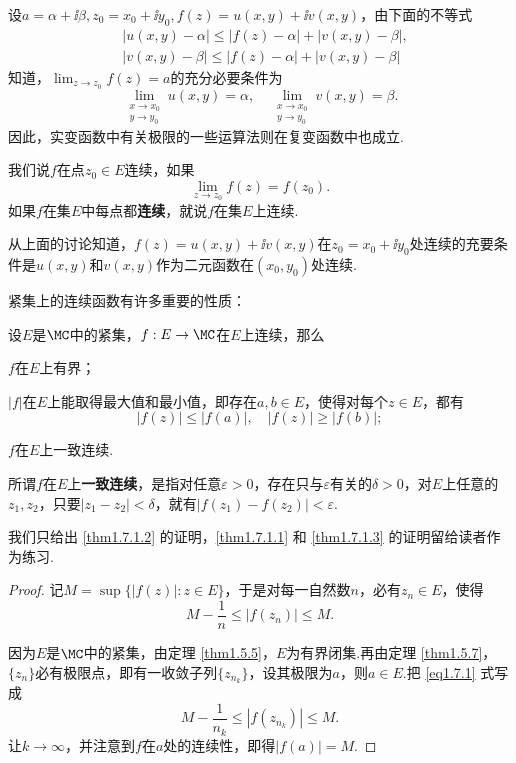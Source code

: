 设$a=\alpha+\ii\beta,z_0=x_0+\ii y_0,f(z)=u(x,y)+\ii v(x,y)$，由下面的不等式
\begin{align*}
 &|u(x,y)-\alpha|\le |f(z)-\alpha|+|v(x,y)-\beta|,\\
 &|v(x,y)-\beta|\le |f(z)-\alpha|+|v(x,y)-\beta|
\end{align*}
知道，$\lim_{z\to z_0}f(z)=a$的充分必要条件为
\[\lim_{\substack{x\to x_0\\y\to y_0}}u(x,y)=\alpha,\quad \lim_{\substack{x\to x_0\\y\to y_0}}v(x,y)=\beta.\]
因此，实变函数中有关极限的一些运算法则在复变函数中也成立.

我们说$f$在点$z_0\in E$连续，如果
\[\lim_{z\to z_0}f(z)=f(z_0).\]
如果$f$在集$E$中每点都\textbf{连续}，就说$f$在集$E$上连续.

从上面的讨论知道，$f(z)=u(x,y)+\ii v(x,y)$在$z_0=x_0+\ii y_0$处连续的充要条件是$u(x,y)$和$v(x,y)$作为二元函数在$(x_0,y_0)$处连续.

紧集上的连续函数有许多重要的性质：
\begin{theorem}\label{thm1.7.1}
设$E$是$\MC$中的紧集，$f:E\to\MC$在$E$上连续，那么
\begin{eenum}
  \item \label{thm1.7.1.1} $f$在$E$上有界；
  \item \label{thm1.7.1.2} $|f|$在$E$上能取得最大值和最小值，即存在$a,b\in E$，使得对每个$z\in E$，都有
    \[|f(z)|\le |f(a)|,\quad |f(z)|\ge |f(b)|;\]
  \item \label{thm1.7.1.3} $f$在$E$上一致连续.
\end{eenum}
\end{theorem}

所谓$f$在$E$上\textbf{一致连续}，是指对任意$\varepsilon>0$，存在只与$\varepsilon$有关的$\delta>0$，对$E$上任意的$z_1,z_2$，只要$|z_1-z_2|<\delta$，就有$|f(z_1)-f(z_2)|<\varepsilon$.

我们只给出 \ref{thm1.7.1.2} 的证明，\ref{thm1.7.1.1} 和 \ref{thm1.7.1.3} 的证明留给读者作为练习.
\begin{proof}
记$M=\sup\{|f(z)|:z\in E\}$，于是对每一自然数$n$，必有$z_n\in E$，使得
\begin{equation}\label{eq1.7.1}
M-\frac1n\le|f(z_n)|\le M.
\end{equation}

因为$E$是$\MC$中的紧集，由定理  \ref{thm1.5.5}，$E$为有界闭集.再由定理 \ref{thm1.5.7}，$\{z_n\}$必有极限点，即有一收敛子列$\{z_{n_k}\}$，设其极限为$a$，则$a\in E$.把 \eqref{eq1.7.1} 式写成
\[M-\frac1{n_k}\le |f(z_{n_k})|\le M.\]
让$k\to\infty$，并注意到$f$在$a$处的连续性，即得$|f(a)|=M$.
\end{proof}

